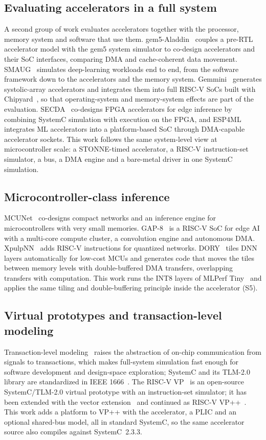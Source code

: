 \documentclass[conference]{IEEEtran}
\begin{document}
\subsection{Evaluating accelerators in a full system}
A second group of work evaluates accelerators together with the processor, memory system and software that use them. gem5-Aladdin~\cite{gem5aladdin} couples a pre-RTL accelerator model with the gem5 system simulator to co-design accelerators and their SoC interfaces, comparing DMA and cache-coherent data movement. SMAUG~\cite{smaug} simulates deep-learning workloads end to end, from the software framework down to the accelerators and the memory system. Gemmini~\cite{gemmini} generates systolic-array accelerators and integrates them into full RISC-V SoCs built with Chipyard~\cite{chipyard}, so that operating-system and memory-system effects are part of the evaluation. SECDA~\cite{secda} co-designs FPGA accelerators for edge inference by combining SystemC simulation with execution on the FPGA, and ESP4ML~\cite{esp4ml} integrates ML accelerators into a platform-based SoC through DMA-capable accelerator sockets. This work follows the same system-level view at microcontroller scale: a STONNE-timed accelerator, a RISC-V instruction-set simulator, a bus, a DMA engine and a bare-metal driver in one SystemC simulation.

\subsection{Microcontroller-class inference}
MCUNet~\cite{mcunet} co-designs compact networks and an inference engine for microcontrollers with very small memories. GAP-8~\cite{gap8} is a RISC-V SoC for edge AI with a multi-core compute cluster, a convolution engine and autonomous DMA. XpulpNN~\cite{xpulpnn} adds RISC-V instructions for quantized networks. DORY~\cite{dory} tiles DNN layers automatically for low-cost MCUs and generates code that moves the tiles between memory levels with double-buffered DMA transfers, overlapping transfers with computation. This work runs the INT8 layers of MLPerf Tiny~\cite{mlperf_tiny} and applies the same tiling and double-buffering principle inside the accelerator (S5).

\subsection{Virtual prototypes and transaction-level modeling}
Transaction-level modeling~\cite{tlm_overview} raises the abstraction of on-chip communication from signals to transactions, which makes full-system simulation fast enough for software development and design-space exploration; SystemC and its TLM-2.0 library are standardized in IEEE 1666~\cite{ieee1666}. The RISC-V VP~\cite{riscv_vp_jsa} is an open-source SystemC/TLM-2.0 virtual prototype with an instruction-set simulator; it has been extended with the vector extension~\cite{riscv_vvp_date} and continued as RISC-V VP++~\cite{riscv_vppp}. This work adds a platform to VP++ with the accelerator, a PLIC and an optional shared-bus model, all in standard SystemC, so the same accelerator source also compiles against SystemC~2.3.3.
\end{document}
